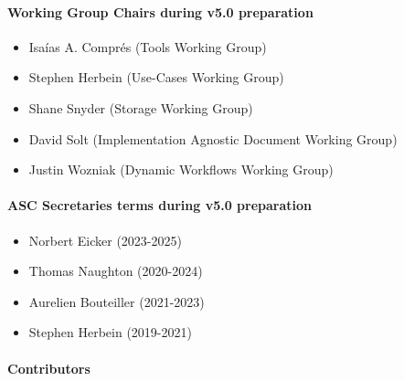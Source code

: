 \paragraph*{Working Group Chairs during v5.0 preparation}

\begin{itemize}
    \item Isaías A. Comprés (Tools Working Group)
    \item Stephen Herbein (Use-Cases Working Group)
    \item Shane Snyder (Storage Working Group)
    \item David Solt (Implementation Agnostic Document Working Group)
    \item Justin Wozniak (Dynamic Workflows Working Group) %
\end{itemize}

\paragraph*{ASC Secretaries terms during v5.0 preparation}

\begin{itemize}
    \item Norbert Eicker (2023-2025)
    \item Thomas Naughton (2020-2024)
    \item Aurelien Bouteiller (2021-2023)
    \item Stephen Herbein (2019-2021)
\end{itemize}

\paragraph*{Contributors}

